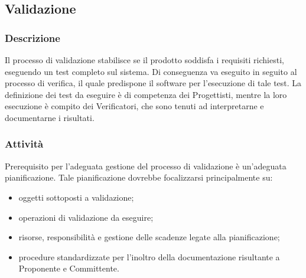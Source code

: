 \subsection{Validazione}
    \subsubsection{Descrizione}
      Il processo di validazione stabilisce se il prodotto soddisfa i requisiti richiesti, eseguendo un test completo sul sistema. Di conseguenza va eseguito in seguito al processo di verifica, il quale predispone il software per l'esecuzione di tale test. La definizione dei test da eseguire è di competenza dei Progettisti, mentre la loro esecuzione è compito dei Verificatori, che sono tenuti ad interpretarne e documentarne i risultati.
    \subsubsection{Attività}
      Prerequisito per l'adeguata gestione del processo di validazione è un'adeguata pianificazione. Tale pianificazione dovrebbe focalizzarsi principalmente su:
      \begin{itemize}
      	\item oggetti sottoposti a validazione;
      	\item operazioni di validazione da eseguire;
      	\item risorse, responsibilità e gestione delle scadenze legate alla pianificazione;
      	\item procedure standardizzate per l'inoltro della documentazione risultante a Proponente e Committente.
      \end{itemize}
